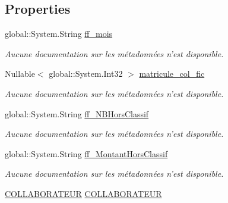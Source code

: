 \subsection*{Properties}
\begin{DoxyCompactItemize}
\item 
global\-::\-System.\-String \hyperlink{class_model_1_1_f_i_c_h_e___f_r_a_i_s_a5eb7f69b224a609736362ff9827a478c}{ff\-\_\-mois}
\begin{DoxyCompactList}\small\item\em Aucune documentation sur les métadonnées n'est disponible. \end{DoxyCompactList}\item 
Nullable$<$ global\-::\-System.\-Int32 $>$ \hyperlink{class_model_1_1_f_i_c_h_e___f_r_a_i_s_a57c78dba67ba315b60093f12a6b4687b}{matricule\-\_\-col\-\_\-fic}
\begin{DoxyCompactList}\small\item\em Aucune documentation sur les métadonnées n'est disponible. \end{DoxyCompactList}\item 
global\-::\-System.\-String \hyperlink{class_model_1_1_f_i_c_h_e___f_r_a_i_s_ad5391808a353591c1469fa57668079d0}{ff\-\_\-\-N\-B\-Hors\-Classif}
\begin{DoxyCompactList}\small\item\em Aucune documentation sur les métadonnées n'est disponible. \end{DoxyCompactList}\item 
global\-::\-System.\-String \hyperlink{class_model_1_1_f_i_c_h_e___f_r_a_i_s_af42dd6d52cf739434c1a9381c86f43f8}{ff\-\_\-\-Montant\-Hors\-Classif}
\begin{DoxyCompactList}\small\item\em Aucune documentation sur les métadonnées n'est disponible. \end{DoxyCompactList}\item 
\hyperlink{class_model_1_1_c_o_l_l_a_b_o_r_a_t_e_u_r}{C\-O\-L\-L\-A\-B\-O\-R\-A\-T\-E\-U\-R} \hyperlink{class_model_1_1_f_i_c_h_e___f_r_a_i_s_a5026ccabe3b6b3c196a9d6a91dd1ef04}{C\-O\-L\-L\-A\-B\-O\-R\-A\-T\-E\-U\-R}

\end{DoxyCompactItemize}
